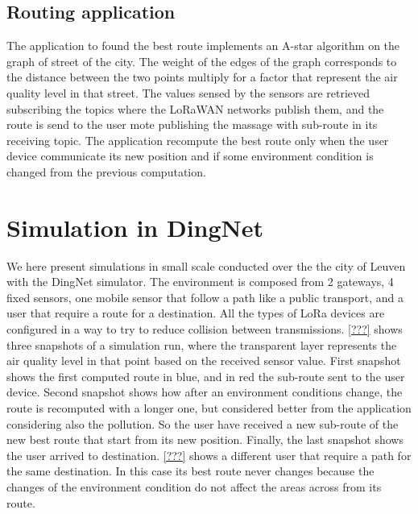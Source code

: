 \subsection*{Routing application}
The application to found the best route implements an A-star algorithm on the graph of street of the city. 
The weight of the edges of the graph corresponds to the distance between the two points multiply for a factor that represent the air quality level in that street. 
The values sensed by the sensors are retrieved subscribing the topics where the LoRaWAN networks publish them, and the route is send to the user mote publishing the massage with sub-route in its receiving topic.
The application recompute the best route only when the user device communicate its new position and if some environment condition is changed from the previous computation.

\section{Simulation in DingNet}
We here present simulations in small scale conducted over the the city of Leuven with the DingNet simulator. 
The environment is composed from 2 gateways, 4 fixed sensors, one mobile sensor that follow a path like a public transport, and a user that require a route for a destination.
All the types of LoRa devices are configured in a way to try to reduce collision between transmissions.
\autoref{???} shows three snapshots of a simulation run, where the transparent layer represents the air quality level in that point based on the received sensor value.
First snapshot shows the first computed route in blue, and in red the sub-route sent to the user device. 
Second snapshot shows how after an environment conditions change, the route is recomputed with a longer one, but considered better from the application considering also the pollution. So the user have received a new sub-route of the new best route that start from its new position.
Finally, the last snapshot shows the user arrived to destination.
\autoref{???} shows a different user that require a path for the same destination. In this case its best route never changes because the changes of the environment condition do not affect the areas across from its route.

\newline
{}